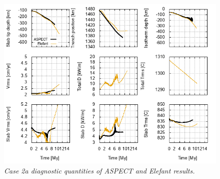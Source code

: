\begin{figure}
    \centering
    \includegraphics[trim=1cm 1cm 10cm 0cm,width=.8\textwidth]{Case2a_diagnostics.png}
    \caption{\it Case 2a diagnostic quantities of ASPECT and Elefant results.}
    \label{fig:QQ_case2a_diagnostics}
\end{figure}

